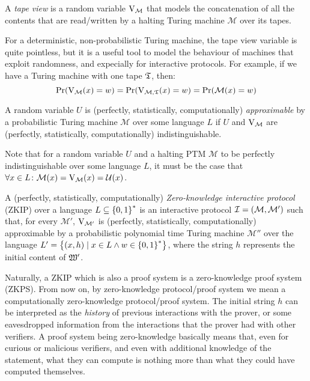 \begin{definition}
  A \emph{tape view} is a random variable \(\mathrm{V}_{\mathcal{M}}\) that models the concatenation 
  of all the contents that are read/written by a halting Turing machine \(\mathcal{M}\) over its 
  tapes.
\end{definition}

For a deterministic, non-probabilistic Turing machine, the tape view variable is quite pointless, 
but it is a useful tool to model the behaviour of machines that exploit randomness, and expecially 
for interactive protocols.
For example, if we have a Turing machine with one tape \(\mathfrak{T} \), then:
\[
  \call{\Pr}{\call{\View_{\mathcal{M}}}{x} = w} = 
  \call{\Pr}{\call{\View_{\mathcal{M}, \Tape}}{x} = w} = 
  \call{\Pr}{\call{\mathcal{M}}{x} = w}
\]


\begin{definition}[Approximability]
  A random variable \(U\) is (perfectly, statistically, computationally) \emph{approximable} by a 
  probabilistic Turing machine \(\mathcal{M}\) over some language \(L\) if \(U\) and 
  \(\mathrm{V}_{\mathcal{M}}\) are (perfectly, statistically, computationally) indistinguishable.
\end{definition}

Note that for a random variable \(U\) and a halting PTM \(\mathcal{M}\) to be perfectly 
indistinguishable over some language \(L\), it must be the case that 
\(\forall x \in L\colon \call{\mathcal{M}}{x} = \call{\View_{\mathcal{M}}}{x} = \call{\mathcal{U}}{x}\).

\begin{definition}
  A (perfectly, statistically, computationally) \emph{Zero-knowledge interactive protocol} (ZKIP) 
  over a language \(L \subseteq \left\{0, 1\right\}^{*}\) is an interactive protocol 
  \(\mathcal{I} = \left(\mathcal{M}, \mathcal{M}'\right)\) such that, for every \(\mathcal{M'}\),
  \(\mathrm{V}_{\mathcal{M'}}\) is (perfectly, statistically, computationally) approximable by a 
  probabilistic polynomial time Turing machine \(\mathcal{M}''\) over the language 
  \(L' = \left\{\left(x, h\right) \mid x \in L \wedge w \in \left\{0, 1\right\}^*\right\}\), where the string
  \(h\) represents the initial content of \(\mathfrak{W}'\).
\end{definition}

Naturally, a ZKIP which is also a proof system is a zero-knowledge proof system (ZKPS).
From now on, by zero-knowledge protocol/proof system we mean a computationally 
zero-knowledge protocol/proof system.
The initial string \(h\) can be interpreted as the \emph{history} of previous interactions with 
the prover, or some eavesdropped information from the interactions that the prover had with other 
verifiers.
A proof system being zero-knowledge basically means that, even for curious or malicious verifiers,
and even with additional knowledge of the statement, what they can compute is nothing more than 
what they could have computed themselves.
